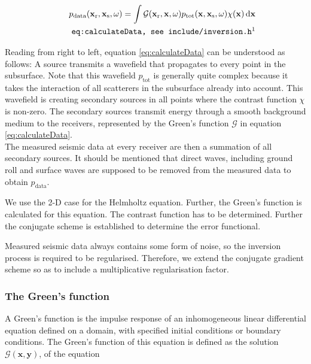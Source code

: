 \documentclass[10pt,a4paper]{article}
\newcommand{\df}[1]{\, \ensuremath{\mbox{d}#1}}
\newcommand{\xs}{\mathbf{x}_\text{s}}
\newcommand{\xr}{\mathbf{x}_\text{r}}
\newcommand{\x}{\mathbf{x}}
\begin{document}
\begin{align}
\label{eq:calculateData}
p_\text{data}(\mathbf{x_\text{r}},\mathbf{x_\text{s}},\omega) = \int
\mathcal{G}(\xr, \x, \omega) p_\text{tot}(\x, \xs, \omega) \chi(\x)
\df{\x}\\
\tag*{\texttt{eq:calculateData, see include/inversion.h\footnotemark}}
\end{align}

Reading from right to left, equation \ref{eq:calculateData} can be understood as
follows: A source transmits a wavefield that propagates to every point
in the subsurface. Note that this wavefield $p_\text{tot}$ is
generally quite complex because it takes the interaction of all
scatterers in the subsurface already into account. This wavefield is
creating secondary sources in all points where the contrast function
$\chi$ is non-zero. The secondary sources transmit energy through a
smooth background medium to the receivers, represented by the Green's
function $\mathcal{G}$ in equation \ref{eq:calculateData}.\\ %
The measured seismic data at every receiver are then a summation of
all secondary sources. It should be mentioned that direct waves,
including ground roll and surface waves are supposed to be removed
from the measured data to obtain $p_\text{data}$.

We use the 2-D case for the Helmholtz equation. Further, the Green's
function is calculated for this equation. The contrast function has to
be determined. Further the conjugate scheme is established to
determine the error functional.

Measured seismic data always contains some form of noise, so the
inversion process is required to be regularised. Therefore, we extend
the conjugate gradient scheme so as to include a multiplicative regularisation factor.

\subsubsection{The Green's function}
A Green's function is the impulse response of an inhomogeneous linear
differential equation defined on a domain, with specified initial
conditions or boundary conditions.
The Green's function of this equation is defined as the solution
$\mathcal{G}(\mathbf{x}, \mathbf{y})$, of the equation
\end{document}
